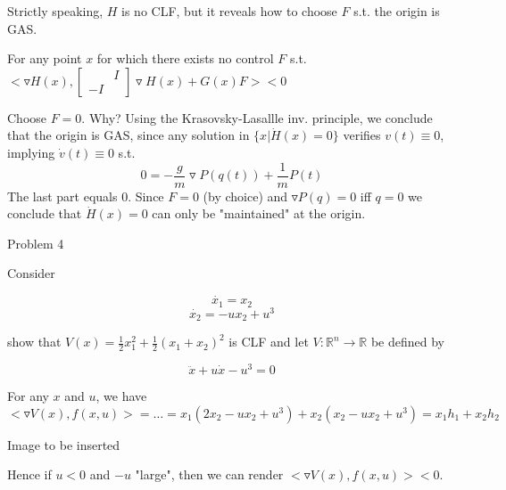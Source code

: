 Strictly speaking, $H$ is no CLF, but it reveals how to choose $F$ s.t. the origin is GAS.

For any point $x$ for which there exists no control $F$ s.t. $<\triangledown H(x), \begin{bmatrix}
 & I \\
 -I & 
\end{bmatrix} \triangledown H(x) + G(x)F> < 0$

Choose $F = 0$. Why? Using the Krasovsky-Lasallle inv. principle, we conclude that the origin is GAS, since any solution in $\{ x| \dot{H}(x) = 0 \}$ verifies $v(t) \equiv 0$, implying $\dot{v}(t) \equiv 0$ s.t. 
\begin{equation*}
0 = - \frac{g}{m} \triangledown P(q(t)) + \frac{1}{m} P(t)
\end{equation*}
The last part equals 0.  Since $F = 0$ (by choice) and $\triangledown P(q) = 0$ iff $q = 0$ we conclude that $\dot{H}(x) = 0$ can only be "maintained" at the origin.

Problem 4

Consider 

\begin{equation*}
\dot{x_1} = x_2
\end{equation*}
\begin{equation*}
\dot{x_2} = - ux_2 + u^3
\end{equation*}

show that $V(x) = \frac{1}{2} x_1^2 + \frac{1}{2}(x_1 +x_2)^2$ is CLF and let $V: \mathbb{R}^n \to \mathbb{R}$ be defined by

\begin{equation*}
\ddot{x} + u\dot{x} - u^3 = 0
\end{equation*}

For any $x$ and $u$, we have $<\triangledown V(x), f(x,u)> = \dots = x_1(2x_2 -ux_2 + u^3) + x_2(x_2 - ux_2 + u^3) = x_1h_1 + x_2h_2$

Image to be inserted

Hence if $u < 0$ and $-u$ "large", then we can render $<\triangledown V(x), f(x,u)> < 0$.
